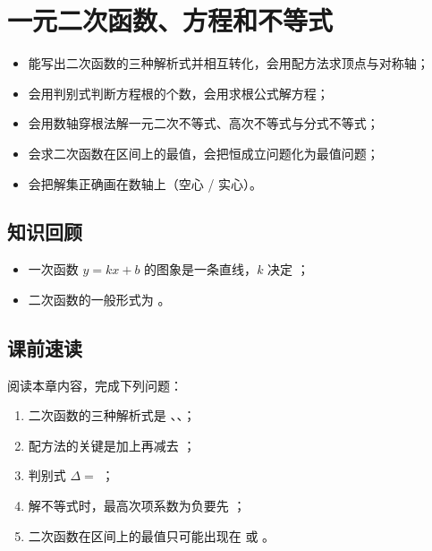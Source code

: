\section{一元二次函数、方程和不等式}

\begin{learnobjective}
\begin{itemize}
  \item 能写出二次函数的三种解析式并相互转化，会用配方法求顶点与对称轴；
  \item 会用判别式判断方程根的个数，会用求根公式解方程；
  \item 会用数轴穿根法解一元二次不等式、高次不等式与分式不等式；
  \item 会求二次函数在区间上的最值，会把恒成立问题化为最值问题；
  \item 会把解集正确画在数轴上（空心 / 实心）。
\end{itemize}
\end{learnobjective}

\begin{preview}
\subsection*{知识回顾}
\begin{itemize}
  \item 一次函数 $y=kx+b$ 的图象是一条直线，$k$ 决定 \blank；
  \item 二次函数的一般形式为 \blank。
\end{itemize}

\subsection*{课前速读}
阅读本章内容，完成下列问题：
\begin{enumerate}
  \item 二次函数的三种解析式是 \blank、\blank、\blank；
  \item 配方法的关键是加上再减去 \blank；
  \item 判别式 $\Delta=$ \blank；
  \item 解不等式时，最高次项系数为负要先 \blank；
  \item 二次函数在区间上的最值只可能出现在 \blank 或 \blank。
\end{enumerate}
\end{preview}

